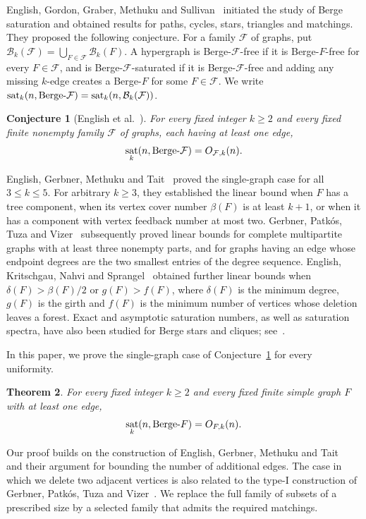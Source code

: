 \documentclass[11pt,a4paper]{article}
\numberwithin{equation}{section}
\newtheorem{theorem}{Theorem}[section]
\newtheorem{conjecture}[theorem]{Conjecture}
\theoremstyle{definition}
\theoremstyle{plain}
\DeclareMathOperator{\sat}{sat}
\newcommand{\BF}{\textup{Berge-}F}
\begin{document}
English, Gordon, Graber, Methuku and Sullivan~\cite{EGGMS}
initiated the study of Berge saturation and obtained results for
paths, cycles, stars, triangles and matchings. They proposed the
following conjecture. For a family $\mathcal F$ of graphs, put
$\mathcal B_k(\mathcal F)=\bigcup_{F\in\mathcal F}\mathcal B_k(F)$.
A hypergraph is Berge-$\mathcal F$-free if it is Berge-$F$-free for
every $F\in\mathcal F$, and is Berge-$\mathcal F$-saturated if it is
Berge-$\mathcal F$-free and adding any missing $k$-edge creates a
Berge-$F$ for some $F\in\mathcal F$. We write
$\sat_k(n,\textup{Berge-}\mathcal F)=\sat_k(n,\mathcal B_k(\mathcal F))$.

\begin{conjecture}[English et al.~{\cite[Conjecture~6.3]{EGGMS}}]\label{conj:family}
For every fixed integer $k\ge2$ and every fixed finite nonempty family
$\mathcal F$ of graphs, each having at least one edge,
\[
 \sat_k(n,\textup{Berge-}\mathcal F)=O_{\mathcal F,k}(n).
\]
\end{conjecture}

English, Gerbner, Methuku and Tait~\cite{EGMT} proved the single-graph
case for all $3\le k\le5$. For arbitrary $k\ge3$, they established
the linear bound when $F$ has a tree component, when its vertex cover
number $\beta(F)$ is at least $k+1$, or when it has a component with
vertex feedback number at most two. Gerbner, Patk\'os, Tuza and
Vizer~\cite[Theorems~1.2 and~1.3]{GPTV} subsequently proved linear bounds
for complete multipartite graphs with at least three nonempty parts,
and for graphs having an edge whose endpoint degrees are the two
smallest entries of the degree sequence.
English, Kritschgau, Nahvi and Sprangel~\cite{EKNS} obtained further
linear bounds when $\delta(F)>\beta(F)/2$ or $g(F)>f(F)$, where
$\delta(F)$ is the minimum degree, $g(F)$ is the girth and $f(F)$
is the minimum number of vertices whose deletion leaves a forest.
Exact and asymptotic saturation numbers, as well as saturation spectra,
have also been studied for Berge stars and cliques;
see~\cite{AE,BEHJR,EKNS,CHX}.

In this paper, we prove the single-graph case of
Conjecture~\ref{conj:family} for every uniformity.

\begin{theorem}\label{thm:main}
For every fixed integer $k\ge2$ and every fixed finite simple graph $F$
with at least one edge,
\[
 \sat_k(n,\BF)=O_{F,k}(n).
\]
\end{theorem}

Our proof builds on the construction of English, Gerbner, Methuku and
Tait~\cite[Construction~2.1]{EGMT} and their argument for bounding the
number of additional edges. The case in which we delete two adjacent
vertices is also related to the type-I construction of Gerbner,
Patk\'os, Tuza and Vizer~\cite[proof of Theorem~1.3]{GPTV}.
We replace the full family of subsets of a prescribed size by a selected
family that admits the required matchings.
\end{document}
